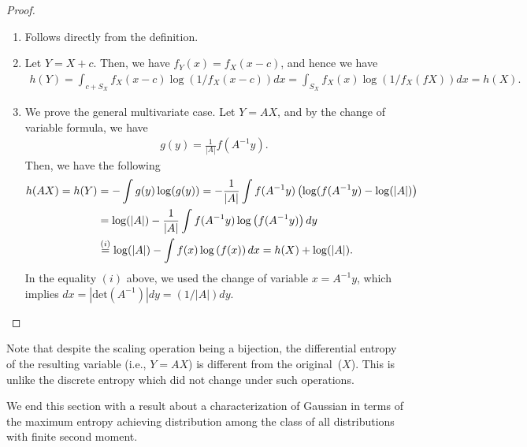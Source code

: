             \begin{proof}
                \begin{enumerate}[label=(\alph*)]
                    \item Follows directly from the definition.  
                    \item Let $Y = X+c$. Then, we have $f_Y(x) = f_X(x-c)$, and hence we have 
                    \begin{align}
                        h(Y) = \int_{c+S_X} f_X(x-c) \log(1/f_X(x-c)) dx = \int_{S_X} f_X(x) \log(1/f_X(fX)) dx = h(X). 
                    \end{align}
                    \item We prove the general multivariate case. Let $Y = AX$, and by the change of variable formula, we have 
                    \begin{align}
                        g(y) = \frac{1}{|A|} f(A^{-1}y).  
                    \end{align}
                    Then, we have the following 
                    \begin{align}
                        h(AX)= h(Y) &= -\int  g(y) \log (g(y)) = - \frac{1}{|A|} \int f(A^{-1}y) \left( \log(f(A^{-1}y) -\log(|A|) \right)  \\
                        & = \log(|A|) - \frac{1}{|A|} \int f(A^{-1}y) \log \left( f(A^{-1}y) \right) dy \\
                        & \stackrel{(i)}{=} \log(|A|) -  \int f(x) \log \left( f(x) \right) dx = h(X) + \log(|A|). 
                    \end{align}
                    In the equality $(i)$ above, we used the change of variable $x = A^{-1}y$, which implies $dx = |\text{det}(A^{-1})|dy = (1/|A|) dy$. 
                \end{enumerate}
            \end{proof}
             \begin{remark}
                \label{remark:diff-entropy-3} 
                Note that despite the scaling operation being a bijection, the differential entropy of the resulting variable (i.e., $Y=AX$) is different from the original~($X$). This is unlike the discrete entropy which did not change under such operations.  
            \end{remark}   
            We end this section with a result about a characterization of Gaussian in terms of the maximum entropy achieving distribution among the class of all distributions with finite second moment. 
